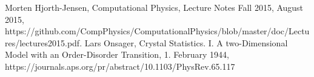 \documentclass[reprint, english,notitlepage,nofootinbib]{revtex4-1}  %
\begin{document}
\onecolumngrid
\vspace{1cm} %

\begin{thebibliography}{}
 Morten Hjorth-Jensen, Computational Physics, Lecture Notes Fall 2015, August 2015, https://github.com/CompPhysics/ComputationalPhysics/blob/master/doc/Lectures/lectures2015.pdf.
 Lars Onsager, Crystal Statistics. I. A two-Dimensional Model with an Order-Disorder Transition, 1. February 1944, https://journals.aps.org/pr/abstract/10.1103/PhysRev.65.117

\end{thebibliography}
\end{document}
